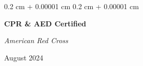\documentclass[10pt, letterpaper]{article}
\newenvironment{highlights}{
    \begin{itemize}[
        topsep=0.10 cm,
        parsep=0.10 cm,
        partopsep=0pt,
        itemsep=0pt,
        leftmargin=0.4 cm + 10pt
    ]
}{
    \end{itemize}
} %
\newenvironment{onecolentry}{
    \begin{adjustwidth}{
        0.2 cm + 0.00001 cm
    }{
        0.2 cm + 0.00001 cm
    }
}{
    \end{adjustwidth}
} %
\newenvironment{twocolentry}[2][]{
    \onecolentry
    \def\secondColumn{#2}
    \setcolumnwidth{\fill, 4.5 cm}
    \begin{paracol}{2}
}{
    \switchcolumn \raggedleft \secondColumn
    \end{paracol}
    \endonecolentry
} %
\begin{document}
\vspace{0.2 cm}

\begin{twocolentry}
    {
        August 2024
    }
    \textbf{CPR \& AED Certified}

    \textit{American Red Cross}
\end{twocolentry}











\end{document}
